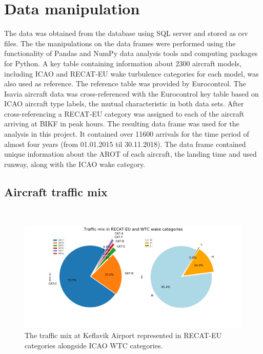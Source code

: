 \section{Data manipulation}
The data was obtained from the database using SQL server and stored as csv files. The the manipulations on the data frames were performed using the functionality of Pandas and NumPy data analysis tools and computing packages for Python. A key table containing information about 2300 aircraft models, including ICAO and RECAT-EU wake turbulence categories for each model, was also used as reference. The reference table was provided by Eurocontrol. The Isavia aircraft data was cross-referenced with the Eurocontrol key table based on ICAO aircraft type labels, the mutual characteristic in both data sets. After cross-referencing a RECAT-EU category was assigned to each of the aircraft arriving at BIKF in peak hours. The resulting data frame was used for the analysis in this project. It contained over 11600  arrivals for the time period of almost four years (from 01.01.2015 til 30.11.2018). The data frame contained unique information about the AROT of each aircraft, the landing time and used runway, along with the ICAO wake category. 


\subsection{Aircraft traffic mix}

\\

\begin{figure}[ht]
    \centering
    \includegraphics[width=1\textwidth]{graphics/fig_post_fast_exit_mix_pie_v2.png}
    \caption[Traffic mix in RECAT-EU and ICAO WTC]{The traffic mix at Keflavik Airport represented in RECAT-EU categories alongside ICAO WTC categories.}
    \label{fig:post_fast_exit_mix_pie_v2}
\end{figure}


